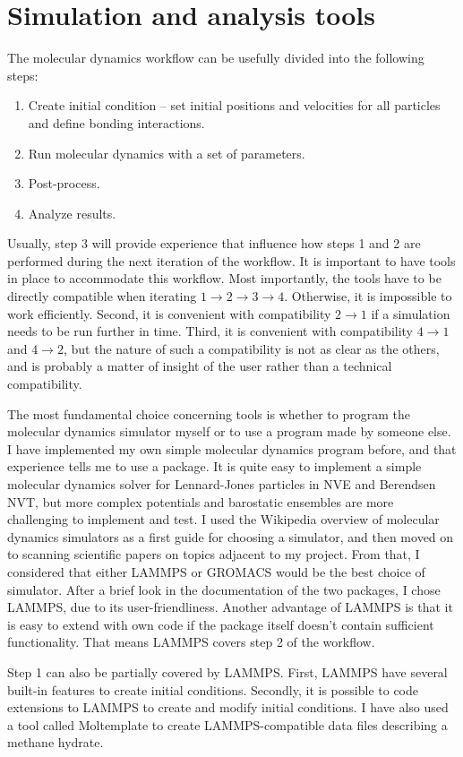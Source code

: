 \chapter{Simulation and analysis tools}
\label{ch:tools}
The molecular dynamics workflow can be usefully divided into the following steps: 
\begin{enumerate}
\item Create initial condition -- set initial positions and velocities for all particles and define bonding interactions.
\item Run molecular dynamics with a set of parameters.
\item Post-process.
\item Analyze results.
\end{enumerate}
Usually, step 3 will provide experience that influence how steps 1 and 2 are performed during the next iteration of the workflow. It is important to have tools in place to accommodate this workflow. Most importantly, the tools have to be directly compatible when iterating $1 \to 2\to 3\to 4$. Otherwise, it is impossible to work efficiently. Second, it is convenient with compatibility $2\to 1$ if a simulation needs to be run further in time. Third, it is convenient with compatibility $4 \to 1$ and $4 \to 2$, but the nature of such a compatibility is not as clear as the others, and is probably a matter of insight of the user rather than a technical compatibility.

The most fundamental choice concerning tools is whether to program the molecular dynamics simulator myself or to use a program made by someone else. I have implemented my own simple molecular dynamics program before, and that experience tells me to use a package. It is quite easy to implement a simple molecular dynamics solver for Lennard-Jones particles in NVE and Berendsen NVT, but more complex potentials and barostatic ensembles are more challenging to implement and test. I used the Wikipedia overview of molecular dynamics simulators as a first guide for choosing a simulator, and then moved on to scanning scientific papers on topics adjacent to my project. From that, I considered that either LAMMPS or GROMACS would be the best choice of simulator. After a brief look in the documentation of the two packages, I chose LAMMPS, due to its user-friendliness. Another advantage of LAMMPS is that it is easy to extend with own code if the package itself doesn't contain sufficient functionality. That means LAMMPS covers step 2 of the workflow. 

Step 1 can also be partially covered by LAMMPS. First, LAMMPS have several built-in features to create initial conditions. Secondly, it is possible to code extensions to LAMMPS to create and modify initial conditions. I have also used a tool called Moltemplate to create LAMMPS-compatible data files describing a methane hydrate.

